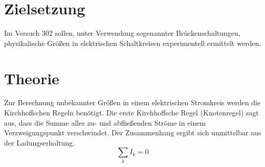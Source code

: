 \setcounter{page}{1}
\section*{Zielsetzung}
Im Versuch 302 sollen, unter Verwendung sogenannter Brückenschaltungen, physikalische Größen
in elektrischen Schaltkreisen experimentell ermittelt werden.
\section{Theorie}\label{abs: theo}
Zur Berechnung unbekannter Größen in einem elektrischen Stromkreis werden die Kirchhoffschen Regeln
benötigt. Die erste Kirchhoffsche Regel (Knotenregel) sagt aus, dass die Summe aller zu- und abfließenden
Ströme in einem Verzweigungspunkt verschwindet. Der Zusammenhang ergibt sich unmittelbar aus der Ladungserhaltung.
\begin{equation}
  \sum_k I_k = 0
  \label{eq: knoten}
\end{equation}

